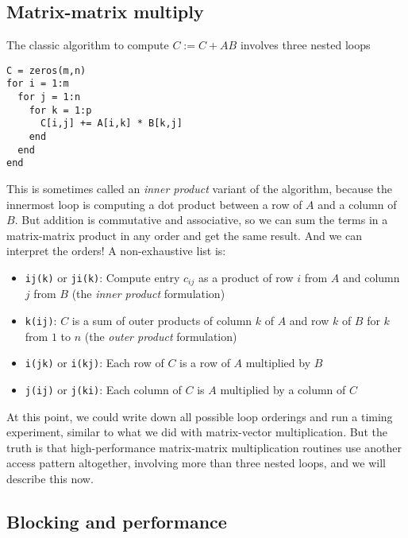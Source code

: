 \documentclass[12pt, leqno]{article}
\begin{document}

\subsection{Matrix-matrix multiply}

The classic algorithm to compute $C := C + AB$ involves
three nested loops
\begin{lstlisting}
C = zeros(m,n)
for i = 1:m
  for j = 1:n
    for k = 1:p
      C[i,j] += A[i,k] * B[k,j]
    end
  end
end
\end{lstlisting} %
This is sometimes called an {\em inner product} variant of
the algorithm, because the innermost loop is computing a dot
product between a row of $A$ and a column of $B$.  But
addition is commutative and associative, so we can sum the
terms in a matrix-matrix product in any order and get the same
result.  And we can interpret the orders!  A non-exhaustive
list is:
\begin{itemize}
\item {\tt ij(k)} or {\tt ji(k)}: Compute entry $c_{ij}$ as a
  product of row $i$ from $A$ and column $j$ from $B$
  (the {\em inner product} formulation)
\item {\tt k(ij)}: $C$ is a sum of outer products of column $k$
  of $A$ and row $k$ of $B$ for $k$ from $1$ to $n$
  (the {\em outer product} formulation)
\item {\tt i(jk)} or {\tt i(kj)}: Each row of $C$ is a row of
  $A$ multiplied by $B$
\item {\tt j(ij)} or {\tt j(ki)}: Each column of $C$ is $A$
  multiplied by a column of $C$
\end{itemize}
At this point, we could write down all possible loop orderings
and run a timing experiment, similar to what we did with
matrix-vector multiplication.  But the truth is that high-performance
matrix-matrix multiplication routines use another access pattern
altogether, involving more than three nested loops, and we will
describe this now.

\subsection{Blocking and performance}
\end{document}

